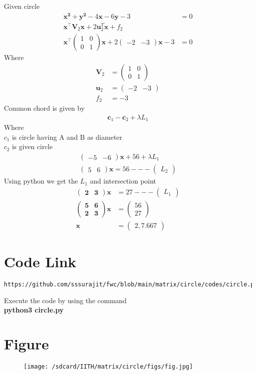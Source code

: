 \documentclass[journal,12pt,twocolumn]{IEEEtran}
\newcommand{\myvec}[1]{\ensuremath{\begin{pmatrix}#1\end{pmatrix}}}
\let\vec\mathbf
\begin{document}
Given circle
\begin{align}
    \vec{{x}^2+{y}^2}-4{\vec x}-6{\vec y}-3&=0\\
    \vec{x}^{\top}\vec{V}_2\vec{x}+2\vec{u}_2^T\vec{x}+f_2&\\
    \vec{x}^{\top}\myvec{1&0\\0&1}\vec{x}+2\myvec{-2&-3}\vec{x}-3&=0
\end{align}
Where
\begin{align}
    \vec{V}_2&=\myvec{1&0\\0&1}\\
    \vec{u}_2&=\myvec{-2&-3}\\
    f_2&={-3}
\end{align}
Common chord is given by
\begin{align}
    \vec{c}_1-\vec{c}_2+\lambda{L_1}
\end{align}
Where\\ $c_1$ is circle having A and B as diameter\\
        $c_2$ is given circle
\begin{align}
\myvec{-5&-6}\vec{x}+56+\lambda L_1\\
\myvec{5&6}\vec{x}=56---\myvec{L_2}
\end{align}
Using python we get the $L_1$ and intersection point
\begin{align}
    \vec{\myvec{2&3}}{\vec x}&=27 ---\myvec{L_1}\\
    \vec{\myvec{5&6\\2&3}}{\vec x}&={\myvec{56\\27}}\\
    \vec{x}&={\myvec{2,7.667}}
\end{align}
\section{\textbf{Code Link}}
\begin{lstlisting}
https://github.com/sssurajit/fwc/blob/main/matrix/circle/codes/circle.py
\end{lstlisting}
Execute the code by using the command
\\ \textbf{python3 circle.py}
\section{\textbf{Figure}}
\begin{figure}
    \centering
    \texttt{[image: /sdcard/IITH/matrix/circle/figs/fig.jpg]}
    \caption{}
    \label{fig}
\end{figure}
\end{document}
